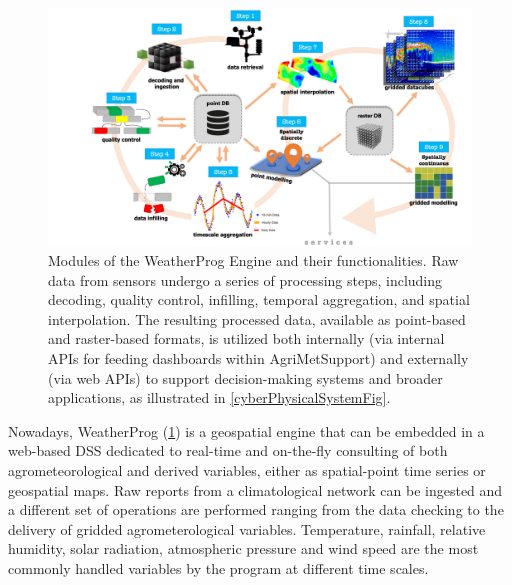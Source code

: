 \documentclass[authoryear,preprint,review,12pt]{elsarticle}
\begin{document}
\begin{figure}[!t] %
	\centering %
	\includegraphics[angle=0,scale=.45,trim=3cm 0cm 0cm 0cm,clip]{figures/Fig04_WeatherProg_modules.png}
	\caption{
            Modules of the WeatherProg Engine and their functionalities. Raw data from sensors undergo a series of processing steps, including decoding, quality control, infilling, temporal aggregation, and spatial interpolation. The resulting processed data, available as point-based and raster-based formats, is utilized both internally (via internal APIs for feeding dashboards within Agri\-Met\-Support) and externally (via web APIs) to support decision-making systems and broader applications, as illustrated in \cref{cyberPhysicalSystemFig}.
 }
	\label{Fig:WeatherProg}
\end{figure}

Nowadays, WeatherProg (\cref{Fig:WeatherProg}) is a geospatial engine that can be embedded in a web-based DSS dedicated to real-time and on-the-fly consulting of both agrometeorological and derived variables, either as spatial-point time series or geospatial maps.
Raw reports from a climatological network can be ingested and a different set of operations are performed ranging from the data checking to the delivery of gridded agrometerological variables.
Temperature, rainfall, relative humidity, solar radiation, atmospheric pressure and wind speed are the most commonly handled variables by the program at different time scales.
\end{document}
